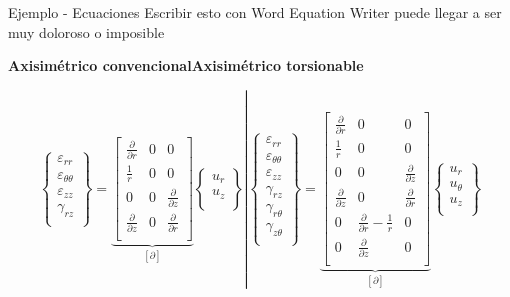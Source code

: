 \documentclass[10pt]{beamer}
\begin{document}
\begin{frame}{Ejemplo - Ecuaciones}
Escribir esto con Word Equation Writer puede llegar a ser muy doloroso o imposible

\hspace{0.45cm}\textbf{Axisimétrico convencional}\hspace{1.2cm}\textbf{Axisimétrico torsionable}

\[
\begin{Bmatrix}
   \varepsilon_{rr} \\
   \varepsilon_{\theta\theta} \\
   \varepsilon_{zz} \\
    \gamma_{rz} \\
\end{Bmatrix}
=
\underbrace{\begin{bmatrix}
   \frac{\partial}{\partial r} & 0 & 0  \\
   \frac{1}{r}    & 0 & 0  \\
   0  & 0 & \frac{\partial}{\partial z}\\
     \frac{\partial}{\partial z} & 0 &\frac{\partial}{\partial r}\\
\end{bmatrix}}_{\left[\partial\right]}
\begin{Bmatrix}
   u_{r} \\
   u_{z} \\
\end{Bmatrix}
\left|
\begin{Bmatrix}
   \varepsilon_{rr} \\
   \varepsilon_{\theta\theta} \\
   \varepsilon_{zz} \\
    \gamma_{rz} \\
     \gamma_{r\theta} \\
      \gamma_{z\theta} \\
\end{Bmatrix}
=
\underbrace{\begin{bmatrix}
   \frac{\partial}{\partial r} & 0 & 0  \\
   \frac{1}{r}    & 0 & 0  \\
   0  & 0 & \frac{\partial}{\partial z}\\
  \frac{\partial}{\partial z} & 0 &\frac{\partial}{\partial r}\\
   0  & \frac{\partial}{\partial r}-\frac{1}{r} & 0\\
     0  & \frac{\partial}{\partial z} & 0\\
\end{bmatrix}}_{\left[ \partial \right]}
\begin{Bmatrix}
   u_{r} \\
   u_{\theta} \\
   u_{z} \\
\end{Bmatrix}\right.
\]	

\end{frame}
\end{document}
